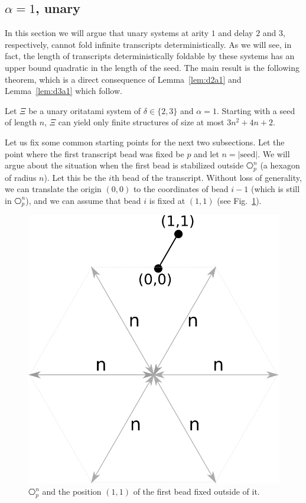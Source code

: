 

\subsection{$\alpha = 1$, unary}
\label{sec:unary}

In this section we will argue that unary systems at arity $1$ and delay $2$ and $3$, respectively, cannot fold infinite transcripts deterministically. As we will see, in fact, the length of transcripts deterministically foldable by these systems has an upper bound quadratic in the length of the seed. The main result is the following theorem, which is a direct consequence of Lemma~\ref{lem:d2a1}  and Lemma~\ref{lem:d3a1} which follow.
\begin{theorem}[$\delta\in\{ 2,3\}, \alpha = 1$]\label{thm:d23a1}
	Let $\Xi$ be a unary oritatami system of $\delta \in \{2,3\}$ and $\alpha = 1$. Starting with a seed of length $n$, $\Xi$ can yield only finite structures of size at most $3n^2+4n+2$.
\end{theorem}

Let us fix some common starting points for the next two subsections. Let the point where the first transcript bead was fixed be $p$ and let $n=|\mathrm{seed}|$. We will argue about the situation when the first bead is stabilized outside $\hexagon_p^n$ (a hexagon of radius $n$). Let this be the $i$th bead of the transcript. Without loss of generality, we can translate the origin $(0,0)$ to the coordinates of bead $i-1$ (which is still in $\hexagon_p^n$), and we can assume that bead $i$ is fixed at $(1,1)$ (see Fig.~\ref{fig:hexagonOut}).
\begin{figure}
	\centering
	\includegraphics[width=0.3\linewidth]{./Fig/hexagonOut}
	\caption{$\hexagon_p^n$ and the position $(1,1)$ of the first bead fixed outside of it.}
	\label{fig:hexagonOut}
\end{figure}


